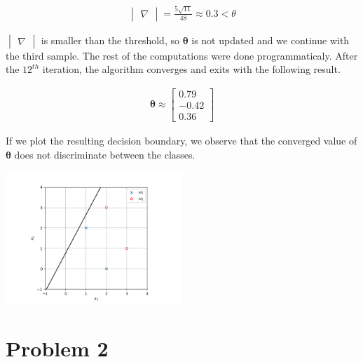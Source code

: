 \documentclass[a4paper, 10pt, twoside]{article}
\begin{document}
\begin{enumerate}[a)]
          \begin{align*}
              \begin{vmatrix}
                  \nabla
              \end{vmatrix} = \frac{5\sqrt{11}}{48} \approx 0.3 < \theta
          \end{align*}

          $\begin{vmatrix} \nabla \end{vmatrix}$ is smaller than the threshold, so $ \bm{\theta} $ is not updated and we continue with the third sample. The rest of the computations were done programmaticaly.
          After the $12^{th}$ iteration, the algorithm converges and exits with the following result.

          \begin{align*}
              \bm{\theta} \approx
              \begin{bmatrix}
                  0.79 \\ -0.42 \\ 0.36
              \end{bmatrix}
          \end{align*}

          If we plot the resulting decision boundary, we observe that the converged value of $\bm{\theta}$ does not discriminate between the classes.

          \begin{center}
              \includegraphics[width=0.5\textwidth]{img/graph4.png}
          \end{center}

\end{enumerate}

\section*{Problem 2}
\end{document}
